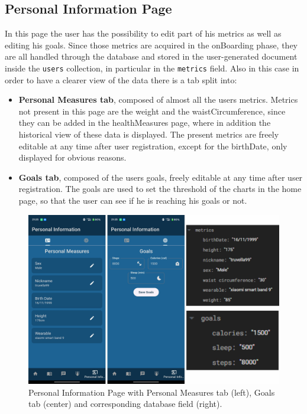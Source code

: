 \subsection{Personal Information Page}
In this page the user has the possibility to edit part of his metrics as well as editing his goals. Since those metrics are acquired in the onBoarding phase, they are all handled through the database and stored in the user-generated document inside the \texttt{users} collection, in particular in the \texttt{metrics} field.
\newline Also in this case in order to have a clearer view of the data there is a tab split into:
\begin{itemize}[nosep] %
    \item \textbf{Personal Measures tab}, composed of almost all the users metrics. Metrics not present in this page are the weight and the waistCircumference, since they can be added in the healthMeasures page, where in addition the historical view of these data is displayed. The present metrics are freely editable at any time after user registration, except for the birthDate, only displayed for obvious reasons.  
    \item \textbf{Goals tab}, composed of the users goals, freely editable at any time after user registration. The goals are used to set the threshold of the charts in the home page, so that the user can see if he is reaching his goals or not.
\end{itemize}

\begin{figure}
    \centering
    \includegraphics[width=0.7\linewidth]{./images/personalInformation.jpg}
    \caption{Personal Information Page with Personal Measures tab (left), Goals tab (center) and corresponding database field (right).}
\end{figure}

